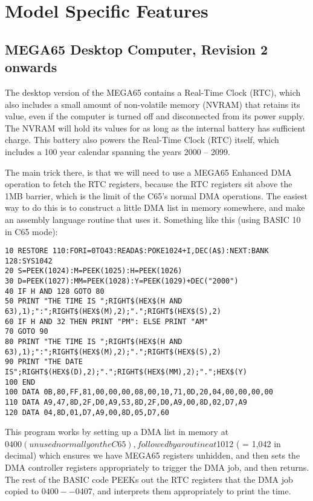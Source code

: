 \chapter{Model Specific Features}

\section{MEGA65 Desktop Computer, Revision 2 onwards}

The desktop version of the MEGA65 contains a Real-Time Clock (RTC), which also includes a small amount of non-volatile memory (NVRAM)
that retains its value, even if the computer is turned off and disconnected from its power supply. The NVRAM will hold its values
for as long as the internal battery has sufficient charge.  This battery also powers the Real-Time Clock (RTC) itself, which includes
a 100 year calendar spanning the years 2000 -- 2099.

The main trick there, is that we will need to use a MEGA65 Enhanced DMA operation to fetch the RTC registers, because the RTC registers sit above the 1MB barrier, which is the limit of the C65's normal DMA operations.  The easiest way to do this is to construct a little DMA list in memory somewhere, and make an assembly language routine that uses it.  Something like this (using BASIC 10 in C65 mode):

\begin{tcolorbox}[colback=black,coltext=white]
\verbatimfont{\codefont}
\begin{verbatim}
10 RESTORE 110:FORI=0TO43:READA$:POKE1024+I,DEC(A$):NEXT:BANK 128:SYS1042
20 S=PEEK(1024):M=PEEK(1025):H=PEEK(1026)
30 D=PEEK(1027):MM=PEEK(1028):Y=PEEK(1029)+DEC("2000")
40 IF H AND 128 GOTO 80
50 PRINT "THE TIME IS ";RIGHT$(HEX$(H AND 63),1);":";RIGHT$(HEX$(M),2);".";RIGHT$(HEX$(S),2)
60 IF H AND 32 THEN PRINT "PM": ELSE PRINT "AM"
70 GOTO 90
80 PRINT "THE TIME IS ";RIGHT$(HEX$(H AND 63),1);":";RIGHT$(HEX$(M),2);".";RIGHT$(HEX$(S),2)
90 PRINT "THE DATE IS";RIGHT$(HEX$(D),2);".";RIGHT$(HEX$(MM),2);".";HEX$(Y)
100 END
100 DATA 0B,80,FF,81,00,00,00,08,00,10,71,0D,20,04,00,00,00,00
110 DATA A9,47,8D,2F,D0,A9,53,8D,2F,D0,A9,00,8D,02,D7,A9
120 DATA 04,8D,01,D7,A9,00,8D,05,D7,60
\end{verbatim}
\end{tcolorbox}


This program works by setting up a DMA list in memory at $0400 (unused normally on the C65), followed by a routine at $1012 ( = 1,042 in decimal) which ensures we have MEGA65 registers unhidden, and then sets the DMA controller registers appropriately to trigger the DMA job, and then returns.  The rest of the BASIC code PEEKs out the RTC registers that the DMA job copied to $0400 -- $0407, and interprets them appropriately to print the time.

